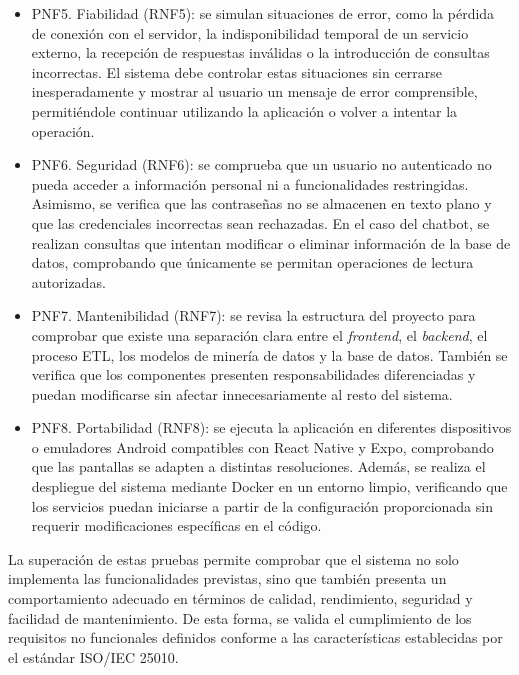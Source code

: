 \begin{itemize}
    \item PNF5. Fiabilidad (RNF5): se simulan situaciones de error, como la pérdida de conexión con el servidor, la indisponibilidad temporal de un servicio externo, la recepción de respuestas inválidas o la introducción de consultas incorrectas. El sistema debe controlar estas situaciones sin cerrarse inesperadamente y mostrar al usuario un mensaje de error comprensible, permitiéndole continuar utilizando la aplicación o volver a intentar la operación.

    \item PNF6. Seguridad (RNF6): se comprueba que un usuario no autenticado no pueda acceder a información personal ni a funcionalidades restringidas. Asimismo, se verifica que las contraseñas no se almacenen en texto plano y que las credenciales incorrectas sean rechazadas. En el caso del chatbot, se realizan consultas que intentan modificar o eliminar información de la base de datos, comprobando que únicamente se permitan operaciones de lectura autorizadas.

    \item PNF7. Mantenibilidad (RNF7): se revisa la estructura del proyecto para comprobar que existe una separación clara entre el \textit{frontend}, el \textit{backend}, el proceso ETL, los modelos de minería de datos y la base de datos. También se verifica que los componentes presenten responsabilidades diferenciadas y puedan modificarse sin afectar innecesariamente al resto del sistema.

    \item PNF8. Portabilidad (RNF8): se ejecuta la aplicación en diferentes dispositivos o emuladores Android compatibles con React Native y Expo, comprobando que las pantallas se adapten a distintas resoluciones. Además, se realiza el despliegue del sistema mediante Docker en un entorno limpio, verificando que los servicios puedan iniciarse a partir de la configuración proporcionada sin requerir modificaciones específicas en el código.

\end{itemize}

La superación de estas pruebas permite comprobar que el sistema no solo implementa las funcionalidades previstas, sino que también presenta un comportamiento adecuado en términos de calidad, rendimiento, seguridad y facilidad de mantenimiento. De esta forma, se valida el cumplimiento de los requisitos no funcionales definidos conforme a las características establecidas por el estándar ISO/IEC 25010.
